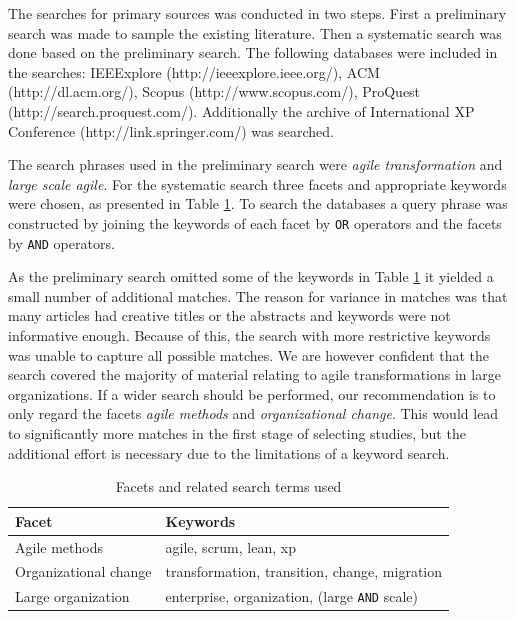 \documentclass[lnbip]{svmultln}
\begin{document}
The searches for primary sources was conducted in two steps. First a preliminary
search was made to sample the existing literature. Then a systematic search was
done based on the preliminary search. The following databases were included in
the searches: IEEExplore (http://ieeexplore.ieee.org/),
ACM (http://dl.acm.org/), Scopus (http://www.scopus.com/),
ProQuest \linebreak (http://search.proquest.com/).
Additionally the archive of International XP
Conference (http://link.springer.com/) was searched.

The search phrases used in the preliminary search were \textit{agile
transformation} and \textit{large scale agile}. For the systematic search three
facets and appropriate keywords were chosen, as presented in Table
\ref{table:searchterms}. To search the databases a query phrase was constructed
by joining the keywords of each facet by \texttt{OR} operators and the facets by
\texttt{AND} operators.

As the preliminary search omitted some of the keywords in Table
\ref{table:searchterms} it yielded a small number of additional matches. The
reason for variance in matches was that many articles had creative titles or the
abstracts and keywords were not informative enough. Because of this, the search
with more restrictive keywords was unable to capture all possible matches.
We are however confident that the search covered the majority of material
relating to agile transformations in large organizations. If a wider search
should be performed, our recommendation is to only regard the facets
\textit{agile methods} and \textit{organizational change}. This would lead to
significantly more matches in the first stage of selecting studies, but the
additional effort is necessary due to the limitations of a keyword search.

\begin{table}[t]
    \begin{tabular}{ l@{ \hskip 0.4cm } l }
        \toprule
        Facet                  & Keywords   \\ \midrule
        Agile methods          & agile, scrum, lean, xp \\ 
        Organizational change  & transformation, transition, change, migration \\
        Large organization     & enterprise, organization, (large \texttt{AND} scale) \\
        \bottomrule
    \end{tabular}
    \caption{Facets and related search terms used}
    \label{table:searchterms}
\end{table}
\end{document}
